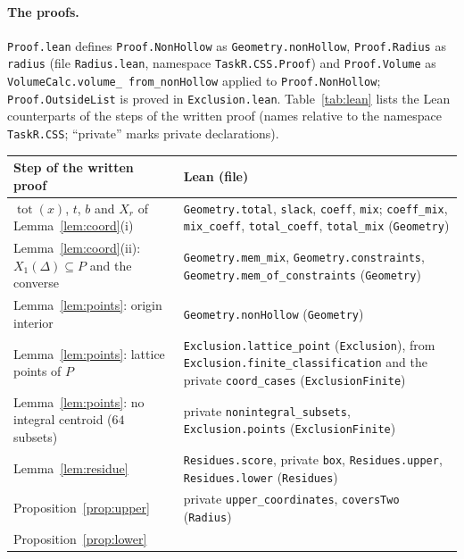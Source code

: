 \documentclass[11pt]{article}
\theoremstyle{definition}
\theoremstyle{remark}
\newcommand{\tot}{\operatorname{tot}}
\begin{document}
{\paragraph{The proofs.}
\texttt{Proof.lean} defines \texttt{Proof.NonHollow} as
\texttt{Geometry.nonHollow}, \texttt{Proof.Radius} as \texttt{radius}
(file \texttt{Radius.lean}, namespace \texttt{TaskR.CSS.Proof}) and
\texttt{Proof.Volume} as \texttt{VolumeCalc.volume\_\allowbreak
from\_\allowbreak nonHollow} applied to \texttt{Proof.NonHollow};
\texttt{Proof.OutsideList} is proved in \texttt{Exclusion.lean}.
Table~\ref{tab:lean} lists the Lean counterparts of the steps of the written
proof (names relative to the namespace \texttt{TaskR.CSS}; ``private''
marks private declarations).

\begin{table}[ht]
\centering\footnotesize
\renewcommand{\arraystretch}{1.05}
\begin{tabular}{@{}>{\raggedright\arraybackslash}p{}>{\raggedright\arraybackslash}p{}@{}}
\hline
Step of the written proof & Lean (file) \\
\hline
$\tot(x)$, $t$, $b$ and $X_r$ of Lemma~\ref{lem:coord}(i) &
\texttt{Geometry.total}, \texttt{slack}, \texttt{coeff}, \texttt{mix};
\texttt{coeff\_mix}, \texttt{mix\_coeff}, \texttt{total\_coeff},
\texttt{total\_mix} (\texttt{Geometry}) \\
Lemma~\ref{lem:coord}(ii): $X_1(\Delta)\subseteq P$ and the converse &
\texttt{Geometry.mem\_mix}, \texttt{Geometry.constraints},
\texttt{Geometry.mem\_of\_constraints} (\texttt{Geometry}) \\
Lemma~\ref{lem:points}: origin interior &
\texttt{Geometry.nonHollow} (\texttt{Geometry}) \\
Lemma~\ref{lem:points}: lattice points of $P$ &
\texttt{Exclusion.lattice\_point} (\texttt{Exclusion}), from
\texttt{Exclusion.finite\_classification} and the private
\texttt{coord\_cases} (\texttt{ExclusionFinite}) \\
Lemma~\ref{lem:points}: no integral centroid ($64$ subsets) &
private \texttt{nonintegral\_subsets}, \texttt{Exclusion.points}
(\texttt{ExclusionFinite}) \\
Lemma~\ref{lem:residue} &
\texttt{Residues.score}, private \texttt{box}, \texttt{Residues.upper},
\texttt{Residues.lower} (\texttt{Residues}) \\
Proposition~\ref{prop:upper} &
private \texttt{upper\_coordinates}, \texttt{coversTwo} (\texttt{Radius}) \\
Proposition~\ref{prop:lower} &

\end{tabular}
\end{table}}
\end{document}
